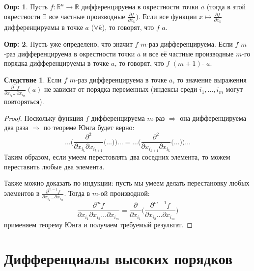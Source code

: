 \documentclass[12pt]{article}
\newcommand{\MR}{\mathbb{R}}
\theoremstyle{definition}
\newtheorem{defn}{Опр:}
\newtheorem{corollary}{Следствие}
\begin{document}
\begin{defn}
	Пусть $f\colon \MR^n \to \MR$ дифференцируема в окрестности точки $a$ \big(тогда в этой окрестности $\exists$ все частные производные $\tfrac{\partial f}{\partial x_k}$\big). Если все функции $x \mapsto \tfrac{\partial f}{\partial x_k}$ дифференцируемы в точке $a$ ($\forall k$), то говорят, что $f$  $a$.
\end{defn}

\begin{defn}
	Пусть уже определено, что значит $f$ $m$-раз дифференцируема. Если $f$ $m$-раз дифференцируема в окрестности точки $a$ и все её частные производные $m$-го порядка дифференцируемы в точке $a$, то говорят, что $f$ $(m+1)$- $a$.
\end{defn}

\begin{corollary}
	Если $f$ $m$-раз дифференцируема в точке $a$, то значение выражения $\tfrac{\partial^m f}{\partial x_{i_1} \dotsc \partial x_{i_m}}(a)$ не зависит от порядка переменных (индексы среди $i_1, \dotsc, i_m$ могут повторяться).
\end{corollary}
\begin{proof}
	Поскольку функция $f$ дифференцируема $m$-раз $\Rightarrow$ она дифференцируема два раза $\Rightarrow$ по теореме Юнга будет верно:
	$$
		\dotsc \bigg(\dfrac{\partial^2 }{\partial x_{i_k} \partial x_{i_{k+1}}} \bigg(\dotsc\bigg) \bigg)\dotsc  = \dotsc \bigg(\dfrac{\partial^2 }{\partial x_{i_{k+1}} \partial x_{i_k} } \bigg(\dotsc\bigg) \bigg)\dotsc
	$$
	Таким образом, если умеем перестовлять два соседних элемента, то можем переставить любые два элемента.
	
	Также можно доказать по индукции: пусть мы умеем делать перестановку любых элементов в $\tfrac{\partial^{m-1} f}{\partial x_{i_2} \dotsc \partial x_{i_m} }$. Тогда в $m$-ой производной:
	$$
		\dfrac{\partial^m f}{\partial x_{i_1} \partial x_{i_2} \dotsc \partial x_{i_m}} = \dfrac{\partial }{\partial x_{i_1}}\bigg(\dfrac{\partial^{m-1} f}{\partial x_{i_2} \dotsc \partial x_{i_m} } \bigg)
	$$
	применяем теорему Юнга и получаем требуемый результат.
\end{proof}

\newpage
\section*{Дифференциалы высоких порядков}
\end{document}
